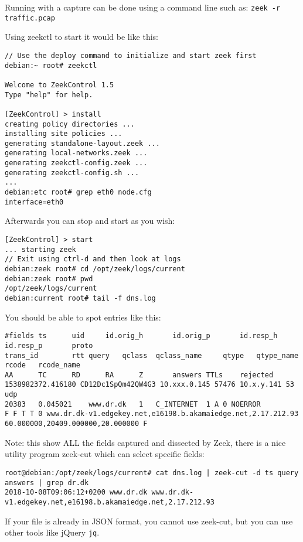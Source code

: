 \documentclass[a4paper,11pt,notitlepage]{report}
\begin{document}
Running with a capture can be done using a command line such as:
\verb+zeek -r traffic.pcap+

Using zeekctl to start it would be like this:
\begin{verbatim}
// Use the deploy command to initialize and start zeek first
debian:~ root# zeekctl

Welcome to ZeekControl 1.5
Type "help" for help.

[ZeekControl] > install
creating policy directories ...
installing site policies ...
generating standalone-layout.zeek ...
generating local-networks.zeek ...
generating zeekctl-config.zeek ...
generating zeekctl-config.sh ...
...
debian:etc root# grep eth0 node.cfg
interface=eth0
\end{verbatim}

Afterwards you can stop and start as you wish:
\begin{verbatim}
[ZeekControl] > start
... starting zeek
// Exit using ctrl-d and then look at logs
debian:zeek root# cd /opt/zeek/logs/current
debian:zeek root# pwd
/opt/zeek/logs/current
debian:current root# tail -f dns.log
\end{verbatim}

You should be able to spot entries like this:
\begin{verbatim}
#fields ts      uid     id.orig_h       id.orig_p       id.resp_h       id.resp_p       proto
trans_id        rtt query   qclass  qclass_name     qtype   qtype_name      rcode   rcode_name
AA      TC      RD      RA      Z       answers TTLs    rejected
1538982372.416180 CD12Dc1SpQm42QW4G3 10.xxx.0.145 57476 10.x.y.141 53	udp
20383	0.045021	www.dr.dk	1	C_INTERNET	1 A 0 NOERROR
F F T T 0 www.dr.dk-v1.edgekey.net,e16198.b.akamaiedge.net,2.17.212.93 60.000000,20409.000000,20.000000 F
\end{verbatim}

Note: this show ALL the fields captured and dissected by Zeek, there is a nice utility program zeek-cut which can select specific fields:

\begin{verbatim}
root@debian:/opt/zeek/logs/current# cat dns.log | zeek-cut -d ts query answers | grep dr.dk
2018-10-08T09:06:12+0200 www.dr.dk www.dr.dk-v1.edgekey.net,e16198.b.akamaiedge.net,2.17.212.93
\end{verbatim}

If your file is already in JSON format, you cannot use zeek-cut, but you can use other tools like jQuery \verb+jq+.
\end{document}
